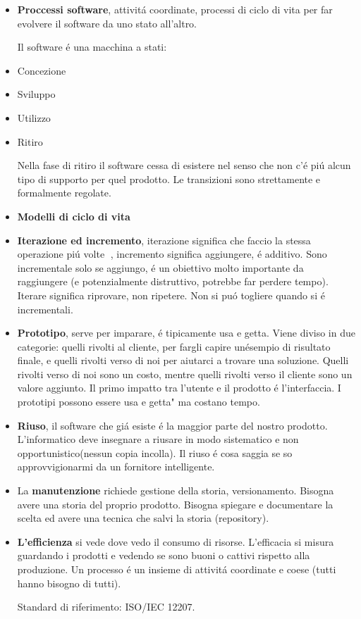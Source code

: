 \documentclass[10pt]{article}
\begin{document}
\begin{itemize}
	
\item \textbf{Proccessi software}, attivit\'a coordinate, processi di ciclo di vita per far evolvere il software da uno stato all'altro.

Il software \'e una macchina a stati:
	\item Concezione
	\item Sviluppo
	\item Utilizzo
	\item Ritiro
	
Nella fase di ritiro il software cessa di esistere nel senso che non c'\'e pi\'u alcun tipo di supporto per quel prodotto.
Le transizioni sono strettamente e formalmente regolate.


\item \textbf{Modelli di ciclo di vita}

\item \textbf{Iterazione ed incremento}, iterazione significa che faccio la 
stessa operazione pi\'u volte , incremento significa aggiungere, \'e additivo. 
Sono incrementale solo se aggiungo, \'e un obiettivo molto importante da 
raggiungere (e potenzialmente distruttivo, potrebbe far perdere tempo). Iterare 
significa riprovare, non ripetere. Non si pu\'o togliere quando si \'e 
incrementali.

\item \textbf{Prototipo}, serve per imparare, \'e tipicamente usa e getta. Viene diviso in due categorie: quelli rivolti al cliente, per fargli capire un\' esempio di risultato finale, e quelli rivolti verso di noi per aiutarci a trovare una soluzione. Quelli rivolti verso di noi sono un costo, mentre quelli rivolti verso il cliente sono un valore aggiunto. Il primo impatto tra l'utente e il prodotto \'e l'interfaccia. I prototipi possono essere usa e getta" ma costano tempo.

\item \textbf{Riuso}, il software che gi\'a esiste \'e la maggior parte del nostro prodotto. L'informatico deve insegnare a riusare in modo sistematico e non opportunistico(nessun copia incolla). Il riuso \'e cosa saggia se so approvvigionarmi da un fornitore intelligente.

\item La \textbf{manutenzione} richiede gestione della storia, versionamento. 
Bisogna avere una storia del proprio prodotto. Bisogna spiegare e documentare 
la scelta ed avere una tecnica che salvi la storia (repository).

\item \textbf{L'efficienza} si vede dove vedo il consumo di risorse. 
L'efficacia si 
misura guardando i prodotti e vedendo se sono buoni o cattivi rispetto alla 
produzione. Un processo \'e un insieme di attivit\'a coordinate e coese (tutti 
hanno bisogno di tutti).

Standard di riferimento: ISO/IEC 12207.	
\end{itemize}
\end{document}
